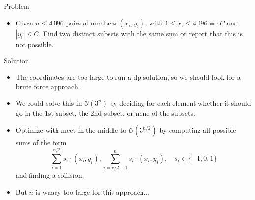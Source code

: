 \begin{frame}
    \frametitle{\problemtitle}
    \begin{block}{Problem}
        \begin{itemize}
        \item Given $n \leq 4\,096$ pairs of numbers $(x_i, y_i)$, with $1 \leq x_i \leq 4\,096 =: C$ and $|y_i| \leq C$. Find two distinct subsets with the same sum or report that this is not possible.
        \end{itemize}
    \end{block}
    \pause
    \begin{block}{Solution}
    \begin{itemize}
        \item<+-> The coordinates are too large to run a dp solution, so we should look for a brute force approach.
        \item<+-> We could solve this in $\mathcal{O}(3^n)$ by deciding for each element whether it should go in the 1st subset, the 2nd subset, or none of the subsets.
        \item<+-> Optimize with meet-in-the-middle to $\mathcal{O}(3^{n/2})$ by computing all possible sums of the form $$\sum_{i=1}^{n/2} s_i \cdot (x_i, y_i), \sum_{i=n/2+1}^{n} s_i \cdot (x_i, y_i),\quad s_i\in\{-1, 0, 1\}$$ and finding a collision.
        \item<+-> But $n$ is waaay too large for this approach...
    \end{itemize}
    \end{block}
\end{frame}

